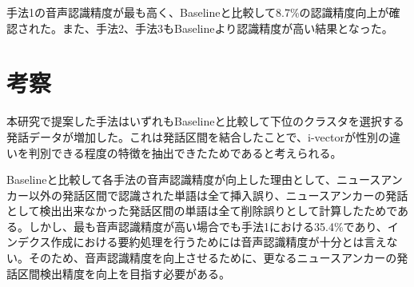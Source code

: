 手法1の音声認識精度が最も高く、Baselineと比較して8.7\%の認識精度向上が確認された。また、手法2、手法3もBaselineより認識精度が高い結果となった。

\section{考察}
本研究で提案した手法はいずれもBaselineと比較して下位のクラスタを選択する発話データが増加した。これは発話区間を結合したことで、i-vectorが性別の違いを判別できる程度の特徴を抽出できたためであると考えられる。\par
Baselineと比較して各手法の音声認識精度が向上した理由として、ニュースアンカー以外の発話区間で認識された単語は全て挿入誤り、ニュースアンカーの発話として検出出来なかった発話区間の単語は全て削除誤りとして計算したためである。しかし、最も音声認識精度が高い場合でも手法1における35.4\%であり、インデクス作成における要約処理を行うためには音声認識精度が十分とは言えない。そのため、音声認識精度を向上させるために、更なるニュースアンカーの発話区間検出精度を向上を目指す必要がある。

